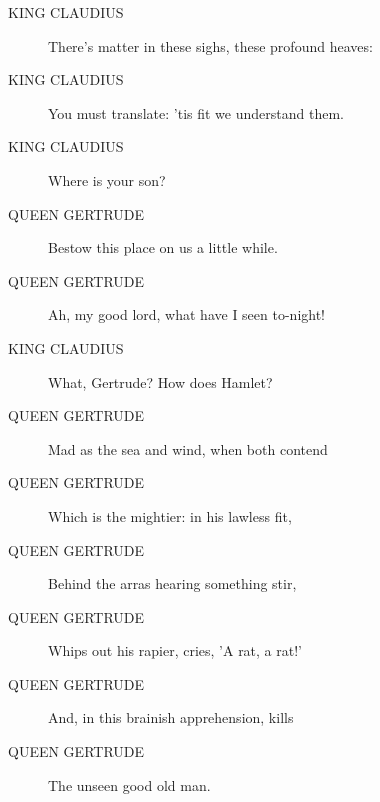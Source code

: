 \documentclass{article}
\begin{document}
\begin{description}
            
\item[KING CLAUDIUS] There's matter in these sighs, these profound heaves:
\item[KING CLAUDIUS] You must translate: 'tis fit we understand them.
\item[KING CLAUDIUS] Where is your son?
\end{description}
          
\begin{description}
            
\item[QUEEN GERTRUDE] Bestow this place on us a little while.
\item[QUEEN GERTRUDE] Ah, my good lord, what have I seen to-night!
\end{description}
          
\begin{description}
            
\item[KING CLAUDIUS] What, Gertrude? How does Hamlet?
\end{description}
          
\begin{description}
            
\item[QUEEN GERTRUDE] Mad as the sea and wind, when both contend
\item[QUEEN GERTRUDE] Which is the mightier: in his lawless fit,
\item[QUEEN GERTRUDE] Behind the arras hearing something stir,
\item[QUEEN GERTRUDE] Whips out his rapier, cries, 'A rat, a rat!'
\item[QUEEN GERTRUDE] And, in this brainish apprehension, kills
\item[QUEEN GERTRUDE] The unseen good old man.
\end{description}
          
\end{document}
